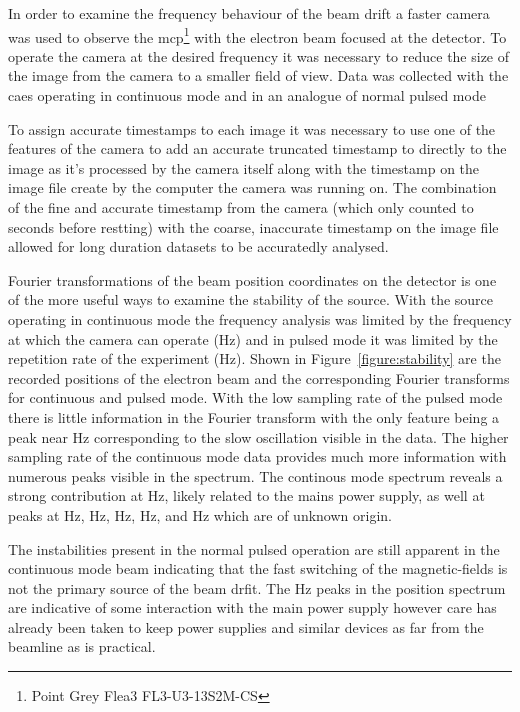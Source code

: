 In order to examine the frequency behaviour of the beam drift a faster camera was used to observe the \gls{mcp}\footnote{Point Grey Flea3 FL3-U3-13S2M-CS} with the electron beam focused at the detector.
To operate the camera at the desired frequency it was necessary to reduce the size of the image from the camera to a smaller field of view.
Data was collected with the \gls{caes} operating in continuous mode and in an analogue of normal pulsed mode

To assign accurate timestamps to each image it was necessary to use one of the features of the camera to add an accurate truncated timestamp to directly to the image as it's processed by the camera itself along with the timestamp on the image file create by the computer the camera was running on.
The combination of the fine and accurate timestamp from the camera (which only counted to \unit[128]{seconds} before restting) with the coarse, inaccurate timestamp on the image file allowed for long duration datasets to be accuratedly analysed.

Fourier transformations of the beam position coordinates on the detector is one of the more useful ways to examine the stability of the source.
With the source operating in continuous mode the frequency analysis was limited by the frequency at which the camera can operate (\unit[240]{Hz}) and in pulsed mode it was limited by the repetition rate of the experiment (\unit[10]{Hz}).
Shown in Figure~\ref{figure:stability} are the recorded positions of the electron beam and the corresponding Fourier transforms for continuous and pulsed mode.
With the low sampling rate of the pulsed mode there is little information in the Fourier transform with the only feature being a peak near \unit[0]{Hz} corresponding to the slow oscillation visible in the data.
The higher sampling rate of the continuous mode data provides much more information with numerous peaks visible in the spectrum.
The continous mode spectrum reveals a strong contribution at \unit[50]{Hz}, likely related to the mains power supply, as well at peaks at \unit[0]{Hz}, \unit[45]{Hz}, \unit[67]{Hz}, \unit[84]{Hz}, and \unit[92]{Hz} which are of unknown origin.

The instabilities present in the normal pulsed operation are still apparent in the continuous mode beam indicating that the fast switching of the magnetic-fields is not the primary source of the beam drfit.
The \unit[50]{Hz} peaks in the position spectrum are indicative of some interaction with the main power supply however care has already been taken to keep power supplies and similar devices as far from the beamline as is practical.

